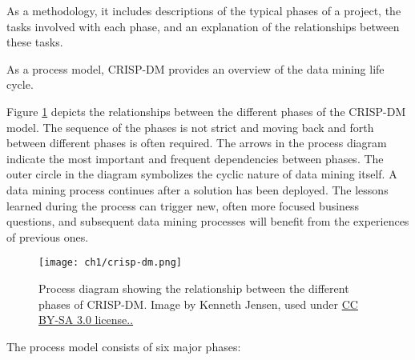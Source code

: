 As a methodology, it includes descriptions of the typical phases of a project, the tasks involved with each phase, and an explanation of the relationships between these tasks.

As a process model, CRISP-DM provides an overview of the data mining life cycle.

Figure \ref{fig:crisp-dm} depicts the relationships between the different phases of the CRISP-DM model. The sequence of the phases is not strict and moving back and forth between different phases is often required. The arrows in the process diagram indicate the most important and frequent dependencies between phases. The outer circle in the diagram symbolizes the cyclic nature of data mining itself. A data mining process continues after a solution has been deployed. The lessons learned during the process can trigger new, often more focused business questions, and subsequent data mining processes will benefit from the experiences of previous ones.

\begin{figure}[hpt]
	\centering
	\texttt{[image: ch1/crisp-dm.png]}
	\caption{Process diagram showing the relationship between the different phases of CRISP-DM. Image by Kenneth Jensen, used under \href{https://creativecommons.org/licenses/by/2.0/}{CC BY-SA 3.0 license..}}
	\label{fig:crisp-dm}
\end{figure}

The process model consists of six major phases:

